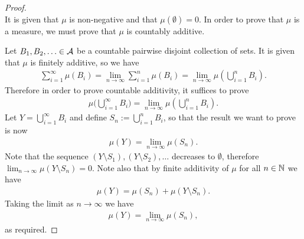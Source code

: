 \begin{proof}~\\
  It is given that $\mu$ is non-negative and that $\mu(\emptyset) = 0$. In order to prove that $\mu$ is a
  measure, we must prove that $\mu$ is countably additive.

  Let $B_1, B_2, \ldots \in \mathcal A$ be a countable pairwise disjoint collection of sets. It is given that $\mu$
  is finitely additive, so we have
  \begin{align*}
    \sum_{i=1}^\infty \mu(B_i) = \lim_{n\to\infty} \sum_{i=1}^n \mu(B_i) = \lim_{n\to\infty} \mu(\bigcup_{i=1}^n B_i).
  \end{align*}
  Therefore in order to prove countable additivity, it suffices to prove
  \begin{align*}
    \mu\big(\bigcup_{i=1}^\infty B_i \big) = \lim_{n\to\infty} \mu(\bigcup_{i=1}^n B_i).
  \end{align*}
  Let $Y = \bigcup_{i=1}^\infty B_i$ and define $S_n := \bigcup_{i=1}^n B_i$, so that the result we want to
  prove is now
  \begin{align*}
    \mu(Y) = \lim_{n\to\infty} \mu(S_n).
  \end{align*}
  Note that the sequence $(Y \setminus S_1), (Y \setminus S_2), \ldots$ decreases to $\emptyset$,
  therefore $\lim_{n\to\infty}\mu(Y \setminus S_n) = 0$. Note also that by finite additivity of $\mu$ for
  all $n \in \mathbb{N}$ we have
  \begin{align*}
    \mu(Y) = \mu(S_n) + \mu(Y \setminus S_n).
  \end{align*}
  Taking the limit as $n \to \infty$ we have
  \begin{align*}
    \mu(Y) = \lim_{n\to\infty} \mu(S_n),
  \end{align*}
  as required.
\end{proof}



